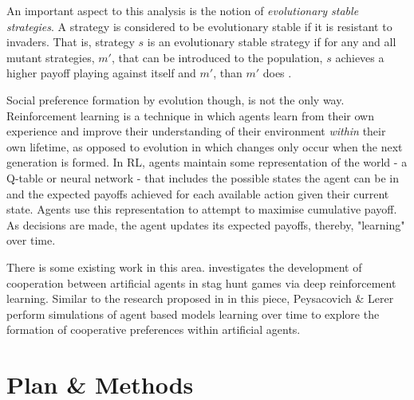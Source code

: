 \documentclass[11pt]{article}
\newcommand*{\np}{\par\noindent\newline}
\begin{document}
\np An important aspect to this analysis is the notion of \textit{evolutionary
stable strategies}. A strategy is considered to be evolutionary stable if it is
resistant to invaders. That is, strategy $s$ is an evolutionary stable strategy
if for any and all mutant strategies, $m'$, that can be introduced to the
population, $s$ achieves a higher payoff playing against itself and $m'$, than
$m'$ does \cite{shoham_multiagent_nodate}.

\np Social preference formation by evolution though,  is not the only way.
Reinforcement learning is a technique in which agents learn from their own
experience and improve their understanding of their environment \textit{within}
their own lifetime, as opposed to evolution in which changes only occur when
the next generation is formed. In RL, agents maintain some representation of
the world - a Q-table or neural network - that includes the possible states the
agent can be in and the expected payoffs achieved for each available action
given their current state. Agents use this representation to attempt to
maximise cumulative payoff. As decisions are made, the agent updates its expected payoffs, thereby, "learning" over time.

\np There is some existing work in this area. \cite{peysakhovich_prosocial_2017}
investigates the development of cooperation between artificial agents in stag
hunt games via deep reinforcement learning. Similar to the research proposed in
in this piece, Peysacovich \& Lerer perform simulations of agent based models
learning over time to explore the formation of cooperative preferences within
artificial agents.

\section{Plan \& Methods}
\end{document}
